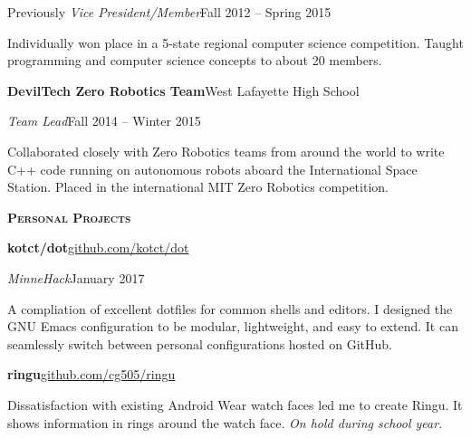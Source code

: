 \documentclass[11pt]{article}
\newcommand{\sectionfont}{\Large\scshape\bfseries\color{cg505green}}
\newcommand{\impact}[1]{\textcolor{cg505green}{\nohyphens{#1}}}
\begin{document}
\begin{minipage}[t]{0.67\textwidth}
\begin{adjustwidth}{10pt}{}
    Previously \emph{Vice President/Member}\hfill Fall 2012 -- Spring 2015

    Individually \impact{won  place} in a 5-state regional computer science competition.
    Taught programming and computer science concepts to about 20 members.
  \end{adjustwidth}

  \textbf{DevilTech Zero Robotics Team}\hfill West Lafayette High School
  \begin{adjustwidth}{10pt}{}
    \emph{Team Lead}\hfill Fall 2014 -- Winter 2015

    Collaborated closely with Zero Robotics teams from \impact{around the world} to write C++ code running on autonomous robots aboard the International Space Station.
    \impact{Placed } in the international MIT Zero Robotics competition.
  \end{adjustwidth}



  \vspace{5pt}

  {\sectionfont Personal Projects}

  \textbf{kotct/dot}\hfill\href{https://github.com/kotct/dot/}{github.com/kotct/dot}
  \begin{adjustwidth}{10pt}{}
    \emph{MinneHack}\hfill January 2017

    A compliation of excellent dotfiles for common shells and editors.
    I designed the GNU Emacs configuration to be modular, lightweight, and easy to extend.
    It can seamlessly switch between personal configurations hosted on GitHub.
  \end{adjustwidth}

  \textbf{ringu}\hfill\href{https://github.com/cg505/ringu/}{github.com/cg505/ringu}
  \begin{adjustwidth}{10pt}{}
    Dissatisfaction with existing Android Wear watch faces led me to create Ringu.
    It shows information in rings around the watch face.
    \emph{On hold during school year.}
  \end{adjustwidth}


\end{minipage}
\end{document}
